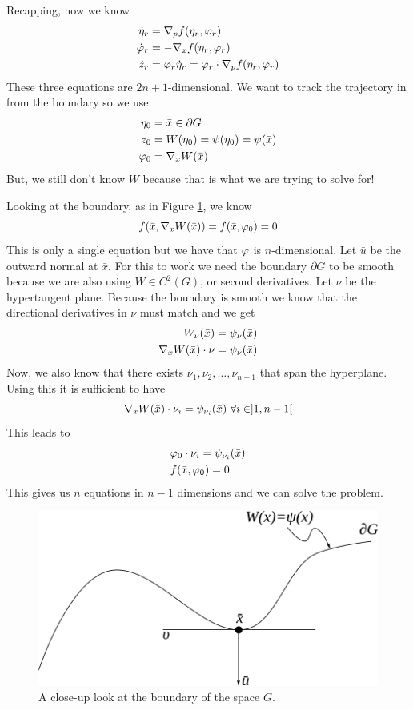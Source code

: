 Recapping, now we know
\begin{align*}
\dot{\eta}_r &= \nabla_pf(\eta_r,\varphi_r) \\
\dot{\varphi}_r &= -\nabla_xf(\eta_r,\varphi_r) \\
\dot{z}_r &= \varphi_r\dot{\eta}_r = \varphi_r\cdot \nabla_pf(\eta_r,\varphi_r)
\end{align*}
These three equations are $2n+1$-dimensional. We want to track the trajectory in from the boundary so we use
\begin{align*}
\eta_0 &= \bar{x} \in \partial G \\
z_0 &= W(\eta_0) = \psi(\eta_0) = \psi(\bar{x}) \\
\varphi_0 &= \nabla_xW(\bar{x})
\end{align*}
But, we still don't know $W$ because that is what we are trying to solve for!

Looking at the boundary, as in Figure \ref{fig:15gboundary}, we know
$$f(\bar{x},\nabla_xW(\bar{x})) = f(\bar{x},\varphi_0) = 0$$
This is only a single equation but we have that $\varphi$ is $n$-dimensional. Let $\bar{u}$ be the outward normal at $\bar{x}$. For this to work we need the boundary $\partial G$ to be smooth because we are also using $W\in C^2(G)$, or second derivatives. Let $\nu$ be the hypertangent plane. Because the boundary is smooth we know that the directional derivatives in $\nu$ must match and we get
\begin{align*}
W_\nu(\bar{x}) &= \psi_\nu(\bar{x}) \\
\nabla_xW(\bar{x})\cdot \nu &= \psi_\nu(\bar{x})
\end{align*}
Now, we also know that there exists $\nu_1,\nu_2,\ldots,\nu_{n-1}$ that span the hyperplane. Using this it is sufficient to have
$$\nabla_xW(\bar{x})\cdot\nu_i = \psi_{\nu_i}(\bar{x}) ~\forall i\in]1,n-1[$$
This leads to
\begin{align*}
&\varphi_0\cdot\nu_i = \psi_{\nu_i}(\bar{x}) \\
&f(\bar{x},\varphi_0) = 0
\end{align*}
This gives us $n$ equations in $n-1$ dimensions and we can solve the problem.

\begin{figure}[ht!]
	\centering
	\includegraphics[width=.4\textwidth]{images/15gboundary}
	\caption{A close-up look at the boundary of the space $G$.}
	\label{fig:15gboundary}
\end{figure}

